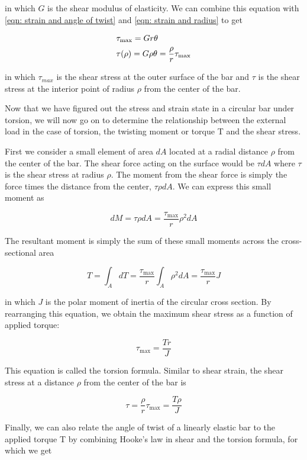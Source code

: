 \documentclass[a4paper,openany,12pt]{book}
\begin{document}
in which \(G\) is the shear modulus of elasticity. We can combine this
equation with \ref{eqn: strain and angle of twist} and \ref{eqn: strain and radius} to get

$$\begin{gathered}
    \tau _{\max } = Gr\theta  \hfill \\
    \tau (\rho ) = G\rho \theta  = \dfrac{\rho }{r}\tau _{\max } \hfill \\ 
  \end{gathered}$$

in which \(\tau_{max}\) is the shear stress at the outer surface of the
bar and \(\tau\) is the shear stress at the interior point of radius
\(\rho\) from the center of the bar.

Now that we have figured out the stress and strain state in a circular
bar under torsion, we will now go on to determine the relationship
between the external load in the case of torsion, the twisting moment or
torque T and the shear stress.

First we consider a small element of area \(dA\) located at a radial
distance \(\rho\) from the center of the bar. The shear force acting on
the surface would be \(\tau dA\) where \(\tau\) is the shear stress at
radius \(\rho\). The moment from the shear force is simply the force times
the distance from the center, \(\tau \rho dA\). We can express this small
moment as

$$dM = \tau \rho dA = \frac{\tau _{\max }}{r}\rho ^2dA$$

The resultant moment is simply the sum of these small moments across the
cross-sectional area


$$T = \int_A {dT}  = \frac{\tau _{\max }}{r}\int_A \rho ^2dA  = \frac{\tau _{\max }}{r}J$$

in which \(J\) is the polar moment of inertia of the circular cross
section. By rearranging this equation, we obtain the maximum shear
stress as a function of applied torque:

$$\tau _{\max } = \frac{Tr}{J}$$

This equation is called the torsion formula. Similar to shear strain,
the shear stress at a distance \(\rho\) from the center of the bar is

$$\tau  = \frac{\rho }{r}\tau _{\max } = \frac{T\rho }{J}$$

Finally, we can also relate the angle of twist of a linearly elastic bar
to the applied torque T by combining Hooke's law in shear and the
torsion formula, for which we get
\end{document}
